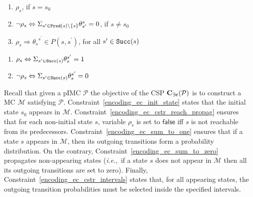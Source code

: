 \documentclass{llncs}
\newcommand{\mc}{\textnormal{MC}}
\newcommand{\pimc}{\textnormal{pIMC}}
\newcommand{\csp}{\textnormal{CSP}}
\newcommand{\Mec} {\ensuremath{{\bf C_{{\exists}c}}}}
\newcommand{\ie} {{\em i.e.},\ }
\newcommand{\ttransition}[1]{\ensuremath{\theta_{#1}}}
\newcommand{\transition}[2]{\ensuremath{\ttransition{#1}^{#2}}}
\newcommand{\Succ}{\ensuremath{{\tt{Succ}}}}
\newcommand{\Pred}{\ensuremath{{\tt{Pred}}}}
\newcommand{\false}            {\ensuremath{\mathsf{false}}}
\newcommand{\enumerateConstraints}{
	\renewcommand{\labelenumi}{\theenumi}
	\renewcommand{\theenumi}{(\textbf{\arabic{enumi})}}}
\begin{document}
\begin{minipage}{\textwidth}
  \hspace{-.4cm}
  \begin{minipage}[t]{.54\textwidth}
    \begin{enumerate}
      \enumerateConstraints
      \item {$\rho_{s}$, 
         if $s = s_0$}\label{encoding_ec_init_state}%
      \setcounter{enumi}{2}
      \item {$\neg \rho_s \Leftrightarrow 
        \Sigma_{s^\prime \in \Pred(s) \setminus \{s\}} \transition{s^\prime}{s} = 0$,
         if $s \ne s_0$}\label{encoding_ec_cstr_reach_propag}%
      \setcounter{enumi}{4}
      \item { $\rho_s \Rightarrow 
        \transition{s}{s^\prime} \in P(s,s^\prime)$,
         for all $s^\prime \in \Succ(s)$}\label{encoding_ec_cstr_intervals}%
    \end{enumerate}
  \end{minipage}
  \hspace{.04\textwidth}
  \begin{minipage}[t]{.4\textwidth}
    \begin{enumerate}
      \enumerateConstraints
      \setcounter{enumi}{1}
      \item { $\rho_s \Leftrightarrow 
        \Sigma_{s^\prime \in \Succ(s)} \transition{s}{s^\prime} = 1$}\label{encoding_ec_sum_to_one}%
      \setcounter{enumi}{3}
      \item { $\neg \rho_s \Leftrightarrow 
        \Sigma_{s^\prime \in \Succ(s)} \transition{s}{s^\prime} = 0$}\label{encoding_ec_sum_to_zero}%
    \end{enumerate}
  \end{minipage}  
\end{minipage}

\smallskip

Recall that given a {\pimc} $\mathcal{P}$ the objective of
  the {\csp} $\Mec(\mathcal{P})$ is to construct a {\mc} $\mathcal{M}$
  satisfying $\mathcal{P}$.  Constraint~\ref{encoding_ec_init_state} states that the initial
  state $s_0$ appears in $\mathcal{M}$.  Constraint~\ref{encoding_ec_cstr_reach_propag} ensures
  that for each non-initial state $s$, variable $\rho_s$ is set to
  {\false} iff $s$ is not reachable from its predecessors.
  Constraint~\ref{encoding_ec_sum_to_one} ensures that if a
  state $s$ appears in $\mathcal{M}$, then its outgoing transitions
  form a probability distribution. 
  On the contrary, Constraint~\ref{encoding_ec_sum_to_zero} propagates 
  non-appearing states (\ie if a state $s$
  does not appear in $\mathcal{M}$ then all its outgoing transitions
  are set to zero).   Finally, Constraint~\ref{encoding_ec_cstr_intervals} states
  that, for all appearing states, the outgoing transition
  probabilities must be selected inside the specified intervals.
\end{document}

